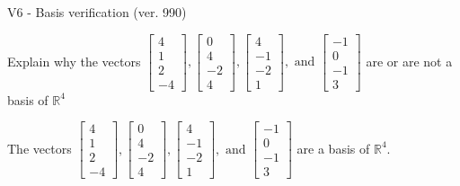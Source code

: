 \begin{exercise}
  \begin{exerciseTitle}V6 - Basis verification (ver. 990)\end{exerciseTitle}
  \begin{exerciseStatement}
    Explain why the vectors \(\left[\begin{array}{r}
4 \\
1 \\
2 \\
-4
\end{array}\right] , \left[\begin{array}{r}
0 \\
4 \\
-2 \\
4
\end{array}\right] , \left[\begin{array}{r}
4 \\
-1 \\
-2 \\
1
\end{array}\right] , \text{ and } \left[\begin{array}{r}
-1 \\
0 \\
-1 \\
3
\end{array}\right]\) are or are not a basis of \(\mathbb{R}^4\)	


  \end{exerciseStatement}
  \begin{exerciseAnswer}
   The vectors \(\left[\begin{array}{r}
4 \\
1 \\
2 \\
-4
\end{array}\right] , \left[\begin{array}{r}
0 \\
4 \\
-2 \\
4
\end{array}\right] , \left[\begin{array}{r}
4 \\
-1 \\
-2 \\
1
\end{array}\right] , \text{ and } \left[\begin{array}{r}
-1 \\
0 \\
-1 \\
3
\end{array}\right]\) 
  	 are  a basis of \(\mathbb{R}^4\).
  


  \end{exerciseAnswer}
\end{exercise}